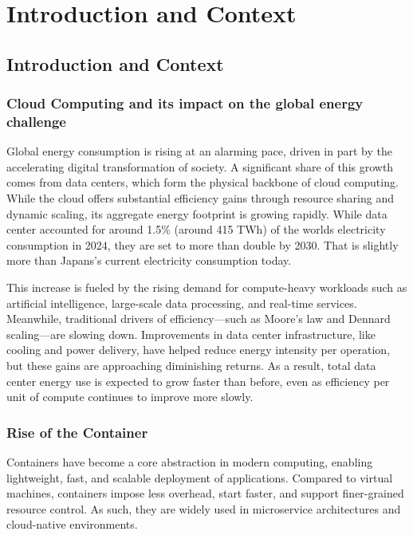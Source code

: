\chapter{Introduction and Context} %
\label{Chapter1}

\section{Introduction and Context}

\subsection{Cloud Computing and its impact on the global energy challenge}

Global energy consumption is rising at an alarming pace, driven in part by the accelerating digital transformation of society. A significant share of this growth comes from data centers, which form the physical backbone of cloud computing. While the cloud offers substantial efficiency gains through resource sharing and dynamic scaling, its aggregate energy footprint is growing rapidly. While data center accounted for around 1.5\% (around 415 TWh) of the worlds electricity consumption in 2024, they are set to more than double by 2030\parencite{iea2025energyai}. That is slightly more than Japans's current electricity consumption today.

This increase is fueled by the rising demand for compute-heavy workloads such as artificial intelligence, large-scale data processing, and real-time services. Meanwhile, traditional drivers of efficiency—such as Moore’s law and Dennard scaling—are slowing down\parencite{tomshardware2023mooreslaw}\parencite{cartesian2013dennard}. Improvements in data center infrastructure, like cooling and power delivery, have helped reduce energy intensity per operation\parencite{uptime2023pue}, but these gains are approaching diminishing returns. As a result, total data center energy use is expected to grow faster than before, even as efficiency per unit of compute continues to improve more slowly\parencite{masanet2020}.

\subsection{Rise of the Container}

Containers have become a core abstraction in modern computing, enabling lightweight, fast, and scalable deployment of applications. Compared to virtual machines, containers impose less overhead, start faster, and support finer-grained resource control. As such, they are widely used in microservice architectures and cloud-native environments\parencite{Potdar2020}.


